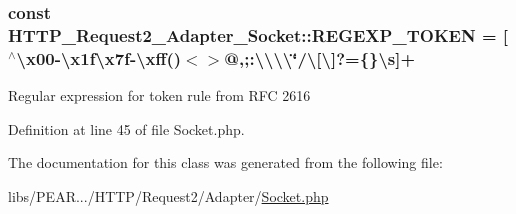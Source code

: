 \subsubsection[{\texorpdfstring{R\+E\+G\+E\+X\+P\+\_\+\+T\+O\+K\+EN}{REGEXP_TOKEN}}]{\setlength{\rightskip}{0pt plus 5cm}const H\+T\+T\+P\+\_\+\+Request2\+\_\+\+Adapter\+\_\+\+Socket\+::\+R\+E\+G\+E\+X\+P\+\_\+\+T\+O\+K\+EN = \textquotesingle{}\mbox{[}$^\wedge$\textbackslash{}x00-\/\textbackslash{}x1f\textbackslash{}x7f-\/\textbackslash{}xff()$<$$>$@,;\+:\textbackslash{}\textbackslash{}\textbackslash{}\textbackslash{}\char`\"{}/\textbackslash{}\mbox{[}\textbackslash{}\mbox{]}?=\{\}\textbackslash{}s\mbox{]}+\textquotesingle{}}\hypertarget{classHTTP__Request2__Adapter__Socket_a56beacc9218c6048c7f9ad5af80959eb}{}\label{classHTTP__Request2__Adapter__Socket_a56beacc9218c6048c7f9ad5af80959eb}
Regular expression for \textquotesingle{}token\textquotesingle{} rule from R\+FC 2616 

Definition at line 45 of file Socket.\+php.



The documentation for this class was generated from the following file\+:\begin{DoxyCompactItemize}
\item 
libs/\+P\+E\+A\+R.../\+H\+T\+T\+P/\+Request2/\+Adapter/\hyperlink{Socket_8php}{Socket.\+php}\end{DoxyCompactItemize}
